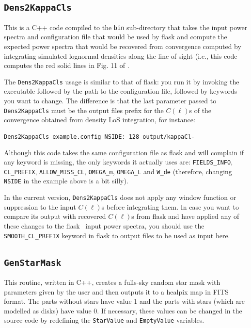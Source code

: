 \documentclass[12pt]{book} %
\begin{document}
\subsection{{\tt Dens2KappaCls}}
\label{sec:dens2kappacls}

This is a C++ code compiled to the {\tt bin} sub-directory that takes the input power spectra and 
configuration file that would be used by {\sc flask} and compute the expected power spectra that 
would be recovered from convergence computed by integrating simulated lognormal densities along 
the line of sight (i.e., this code computes the red solid lines in Fig. 11 of \citet{Xavier16mn}. 

The {\tt Dens2KappaCls} usage is similar to that of {\sc flask}: you run it by invoking the 
executable followed by the path to the configuration file, followed by keywords you want to 
change. The difference is that the last parameter passed to {\tt Dens2KappaCls} must be the 
output files prefix for the $C(\ell)$s of the convergence obtained from density LoS integration, 
for instance:

\noindent
{\tt Dens2KappaCls example.config NSIDE: 128 output/kappaCl-}

Although this code takes the same configuration file as {\sc flask} and will complain if any 
keyword is missing, the only keywords it actually uses are: {\tt FIELDS\_INFO}, 
{\tt CL\_PREFIX}, {\tt ALLOW\_MISS\_CL}, {\tt OMEGA\_m}, {\tt OMEGA\_L} and 
{\tt W\_de} (therefore, changing {\tt NSIDE} in the example 
above is a bit silly).

In the current version, {\tt Dens2KappaCls} does not apply any window function or suppression 
to the input $C(\ell)$s before integrating them. In case you want to compare its output with 
recovered $C(\ell)$s from {\sc flask} and have applied any of these changes to the {\sc flask} \
input power spectra, you should use the {\tt SMOOTH\_CL\_PREFIX} keyword in {\sc flask} to 
output files to be used as input here.

\subsection{{\tt GenStarMask}}
\label{sec:genstarmask}

This routine, written in C++, creates a fulls-sky random star mask with parameters given by the user and 
then outputs it to a {\sc healpix} map in FITS format. The parts without stars have value 1 and 
the parts with stars (which are modelled as disks) have value 0. If necessary, these values 
can be changed in the source code by redefining the {\tt StarValue} and {\tt EmptyValue} 
variables.
\end{document}
